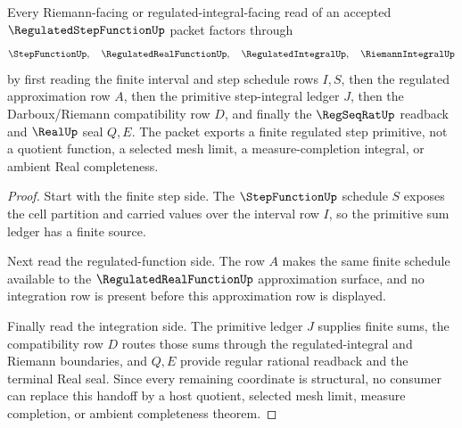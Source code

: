 \begin{theorem}
\label{thm:regulated-step-function-riemann-handoff}
Every Riemann-facing or regulated-integral-facing read of an accepted $\RegulatedStepFunctionUp$ packet factors through
$$
\StepFunctionUp,\quad \RegulatedRealFunctionUp,\quad \RegulatedIntegralUp,\quad \RiemannIntegralUp
$$
by first reading the finite interval and step schedule rows $I,S$, then the regulated approximation row $A$, then the primitive step-integral ledger $J$, then the Darboux/Riemann compatibility row $D$, and finally the $\RegSeqRatUp$ readback and $\RealUp$ seal $Q,E$. The packet exports a finite regulated step primitive, not a quotient function, a selected mesh limit, a measure-completion integral, or ambient Real completeness.
\end{theorem}
\begin{proof}
Start with the finite step side. The $\StepFunctionUp$ schedule $S$ exposes the cell partition and carried values over the interval row $I$, so the primitive sum ledger has a finite source.

Next read the regulated-function side. The row $A$ makes the same finite schedule available to the $\RegulatedRealFunctionUp$ approximation surface, and no integration row is present before this approximation row is displayed.

Finally read the integration side. The primitive ledger $J$ supplies finite sums, the compatibility row $D$ routes those sums through the regulated-integral and Riemann boundaries, and $Q,E$ provide regular rational readback and the terminal Real seal. Since every remaining coordinate is structural, no consumer can replace this handoff by a host quotient, selected mesh limit, measure completion, or ambient completeness theorem.
\end{proof}



